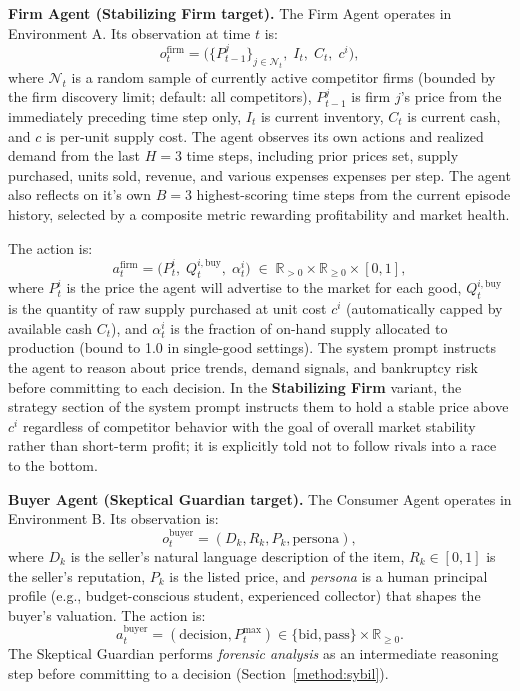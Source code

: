 \textbf{Firm Agent (Stabilizing Firm target).}
The Firm Agent operates in Environment A. Its observation at time $t$ is:
\begin{equation}
    o_t^{\text{firm}} = \bigl(\{P_{t-1}^{j}\}_{j \in \mathcal{N}_t},\; I_t,\; C_t,\; c^i\bigr),
\end{equation}
where $\mathcal{N}_t$ is a random sample of currently active competitor firms (bounded by the firm discovery limit; default: all competitors), $P_{t-1}^{j}$ is firm $j$'s price from the immediately preceding time step only, $I_t$ is current inventory, $C_t$ is current cash, and $c$ is per-unit supply cost. The agent observes its own actions and realized demand from the last $H=3$ time steps, including prior prices set, supply purchased, units sold, revenue, and various expenses expenses per step. 
The agent also reflects on it's own $B=3$ highest-scoring time steps from the current episode history, selected by a composite metric rewarding profitability and market health.

The action is:
\begin{equation}
    a_t^{\text{firm}} = \bigl(P_t^i,\; Q_t^{i,\text{buy}},\; \alpha_t^i\bigr)
    \;\in\; \mathbb{R}_{>0} \times \mathbb{R}_{\geq 0} \times [0,1],
\end{equation}
where $P_t^i$ is the price the agent will advertise to the market for each good, $Q_t^{i,\text{buy}}$ is the quantity of raw supply purchased at unit cost $c^i$ (automatically capped by available cash $C_t$), and $\alpha_t^i$ is the fraction of on-hand supply allocated to production (bound to 1.0 in single-good settings). The system prompt instructs the agent to reason about price trends, demand signals, and bankruptcy risk before committing to each decision. In the \textbf{Stabilizing Firm} variant, the strategy section of the system prompt instructs them to hold a stable price above $c^i$ regardless of competitor behavior with the goal of overall market stability rather than short-term profit; it is explicitly told not to follow rivals into a race to the bottom.

\textbf{Buyer Agent (Skeptical Guardian target).}
The Consumer Agent operates in Environment B. Its observation is:
\begin{equation}
    o_t^{\text{buyer}} = (D_k, R_k, P_k, \text{persona}),
\end{equation}
where $D_k$ is the seller's natural language description of the item, $R_k \in [0,1]$ is the seller's reputation, $P_k$ is the listed price, and \textit{persona} is a human principal profile (e.g., budget-conscious student, experienced collector) that shapes the buyer's valuation. The action is:
\begin{equation}
    a_t^{\text{buyer}} = (\text{decision}, P_t^{\max}) \in \{\text{bid}, \text{pass}\} \times \mathbb{R}_{\geq 0}.
\end{equation}
The Skeptical Guardian performs \textit{forensic analysis} as an intermediate reasoning step before committing to a decision (Section~\ref{method:sybil}).

